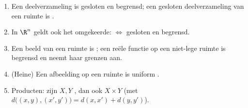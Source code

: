 \begin{theorem}\label{thm:b2:metric:compactprops}
\begin{enumerate}
  \item Een  deelverzameling is gesloten en begrensd; een
        gesloten deelverzameling van een  ruimte is
        .
  \item In $\R^n$ geldt ook het omgekeerde:  $\iff$ gesloten
        en begrensd.
  \item Een  beeld van een  ruimte is ; een
         reële functie op een niet-lege  ruimte is
        begrensd en neemt haar grenzen aan.
  \item (Heine) Een  afbeelding op een  ruimte is
        uniform .
  \item Producten: zijn $X, Y$ , dan ook $X \times Y$ (met
        $d\bigl((x,y),(x',y')\bigr) = d(x,x') + d(y,y')$).
\end{enumerate}
\end{theorem}

